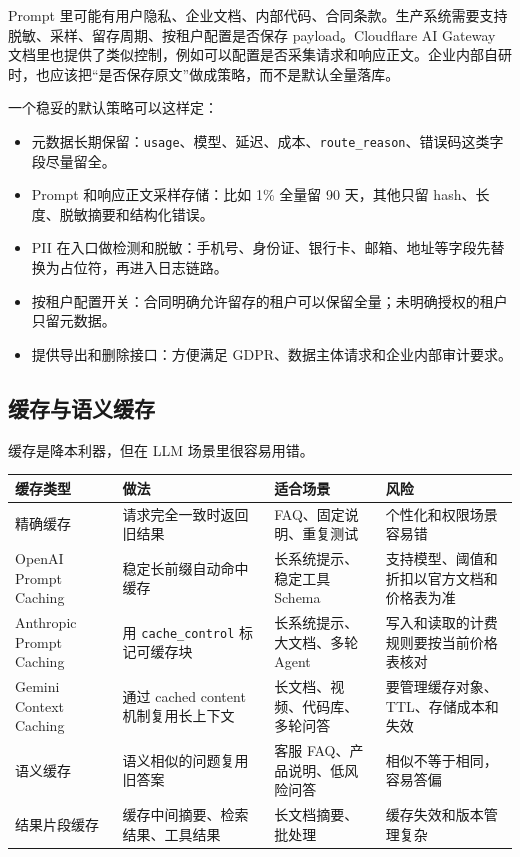 \documentclass[9pt,a4paper,twocolumn]{ctexart}
\begin{document}
Prompt 里可能有用户隐私、企业文档、内部代码、合同条款。生产系统需要支持脱敏、采样、留存周期、按租户配置是否保存 payload。Cloudflare AI Gateway 文档里也提供了类似控制，例如可以配置是否采集请求和响应正文。企业内部自研时，也应该把“是否保存原文”做成策略，而不是默认全量落库。



一个稳妥的默认策略可以这样定：


\begin{itemize}[itemsep=1pt, topsep=2pt]
  \item 元数据长期保留：\texttt{usage}、模型、延迟、成本、\texttt{route\_reason}、错误码这类字段尽量留全。
  \item Prompt 和响应正文采样存储：比如 1\% 全量留 90 天，其他只留 hash、长度、脱敏摘要和结构化错误。
  \item PII 在入口做检测和脱敏：手机号、身份证、银行卡、邮箱、地址等字段先替换为占位符，再进入日志链路。
  \item 按租户配置开关：合同明确允许留存的租户可以保留全量；未明确授权的租户只留元数据。
  \item 提供导出和删除接口：方便满足 GDPR、数据主体请求和企业内部审计要求。
\end{itemize}


\subsection*{缓存与语义缓存}


缓存是降本利器，但在 LLM 场景里很容易用错。


{\footnotesize
\begin{tabular}{|p{}|p{}|p{}|p{}|}
\hline
\textbf{缓存类型} & \textbf{做法} & \textbf{适合场景} & \textbf{风险} \\
\hline
精确缓存 & 请求完全一致时返回旧结果 & FAQ、固定说明、重复测试 & 个性化和权限场景容易错 \\
\hline
OpenAI Prompt Caching & 稳定长前缀自动命中缓存 & 长系统提示、稳定工具 Schema & 支持模型、阈值和折扣以官方文档和价格表为准 \\
\hline
Anthropic Prompt Caching & 用 \texttt{cache\_control} 标记可缓存块 & 长系统提示、大文档、多轮 Agent & 写入和读取的计费规则要按当前价格表核对 \\
\hline
Gemini Context Caching & 通过 cached content 机制复用长上下文 & 长文档、视频、代码库、多轮问答 & 要管理缓存对象、TTL、存储成本和失效 \\
\hline
语义缓存 & 语义相似的问题复用旧答案 & 客服 FAQ、产品说明、低风险问答 & 相似不等于相同，容易答偏 \\
\hline
结果片段缓存 & 缓存中间摘要、检索结果、工具结果 & 长文档摘要、批处理 & 缓存失效和版本管理复杂 \\
\hline
\end{tabular}
}
\end{document}
